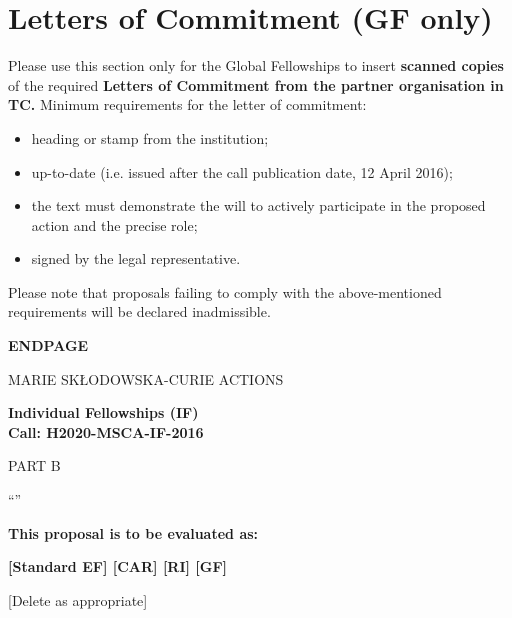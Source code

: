 \newpage
\section{Letters of Commitment (GF only)}
\label{sec:letters}

Please use this section only for the Global Fellowships to insert {\bf scanned copies} of the required {\bf Letters of Commitment from the partner organisation in TC.} 
Minimum requirements for the letter of commitment: 

\begin{itemize}
  \item heading or stamp from the institution; 
  \item up-to-date (i.e. issued after the call publication date, 12 April 2016); 
  \item the text must demonstrate the will to actively participate in the proposed action and the precise role;
  \item signed by the legal representative.
\end{itemize}


\medskip\noindent
Please note that proposals failing to comply with the above-mentioned requirements will be declared inadmissible.





\newpage
\label{sec:endpage}
\vspace{15mm}
\begin{center}


        \Large{
      
     
        \textbf{ENDPAGE}
  
          \vspace{15mm}
          MARIE SK\L{}ODOWSKA-CURIE ACTIONS\\
          \vspace{1cm}
          
          \textbf{Individual Fellowships (IF)}\\
          \textbf{Call: H2020-MSCA-IF-2016}
          \vspace{2cm}                   

          PART B
          \vspace{2.5cm}

          ``\acronym''
          \vspace{2cm}

          \textbf{This proposal is to be evaluated as:}
          \vspace{.5cm}

          \textbf{[Standard EF] [CAR] [RI] [GF]}\\
        }
        \large{[Delete as appropriate]}

  \end{center}
\vspace{1cm}
